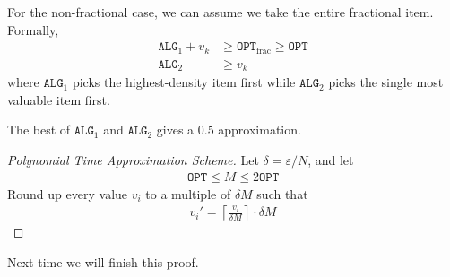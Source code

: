 For the non-fractional case, we can assume we take the entire fractional item. Formally,
\begin{align}
    \texttt{ALG}_1 + v_k &\ge \texttt{OPT}_\text{frac} \ge \texttt{OPT} \\
    \texttt{ALG}_2 &\ge v_k
\end{align}
where $\texttt{ALG}_1$ picks the highest-density item first while $\texttt{ALG}_2$ picks the single most valuable item first.

\begin{proposition}
    The best of $\texttt{ALG}_1$ and $\texttt{ALG}_2$ gives a 0.5 approximation.
\end{proposition}

\begin{proof}[Polynomial Time Approximation Scheme]

Let $\delta = \varepsilon / N$, and let
\begin{align}
    \texttt{OPT} \le M \le 2\texttt{OPT}
\end{align}
Round up every value $v_i$ to a multiple of $\delta M$ such that
\begin{align}
    v_i' = \left\lceil \frac{v_i}{\delta M} \right\rceil \cdot \delta M
\end{align}

\end{proof}

Next time we will finish this proof.
